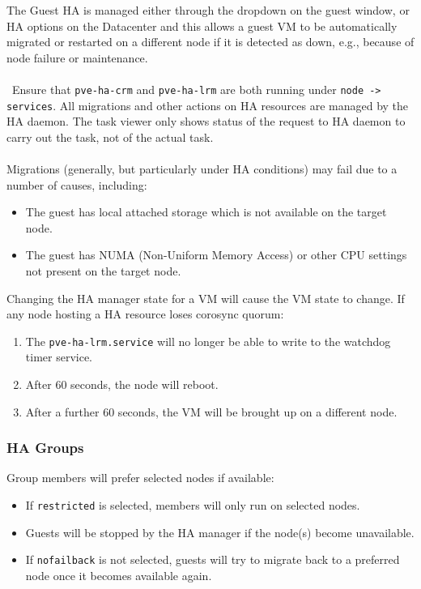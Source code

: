 \documentclass[a4paper,11pt]{article}
\begin{document}
The Guest HA is managed either through the dropdown on the guest window, or HA options on the Datacenter and this allows a guest VM to be automatically migrated or restarted on a different node if it is detected as down, e.g., because of node failure or maintenance.
\\\\\
Ensure that \verb|pve-ha-crm| and \verb|pve-ha-lrm| are both running under \verb|node -> services|.
All migrations and other actions on HA resources are managed by the HA daemon.
The task viewer only shows status of the request to HA daemon to carry out the task, not of the actual task.
\\\\
Migrations (generally, but particularly under HA conditions) may fail due to a number of causes, including:
\begin{itemize}
    \item   The guest has local attached storage which is not available on the target node.
    \item   The guest has NUMA (Non-Uniform Memory Access) or other CPU settings not present on the target node.
\end{itemize}

Changing the HA manager state for a VM will cause the VM state to change.
If any node hosting a HA resource loses corosync quorum:
\begin{enumerate}
    \item   The \verb|pve-ha-lrm.service| will no longer be able to write to the watchdog timer service.
    \item   After 60 seconds, the node will reboot.
    \item   After a further 60 seconds, the VM will be brought up on a different node.
\end{enumerate}

\subsubsection{HA Groups}
Group members will prefer selected nodes if available:
\begin{itemize}
    \item   If \verb|restricted| is selected, members will only run on selected nodes.
    \item   Guests will be stopped by the HA manager if the node(s) become unavailable.
    \item   If \verb|nofailback| is not selected, guests will try to migrate back to a preferred node once it becomes available again.
\end{itemize}
\end{document}
